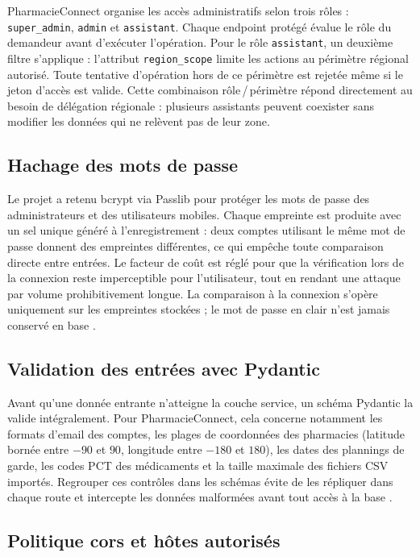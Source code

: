 PharmacieConnect organise les accès administratifs selon trois rôles : \texttt{super\_admin},
\texttt{admin} et \texttt{assistant}. Chaque endpoint protégé évalue le rôle du demandeur avant d'exécuter
l'opération. Pour le rôle \texttt{assistant}, un deuxième filtre s'applique : l'attribut
\texttt{region\_scope} limite les actions au périmètre régional autorisé. Toute tentative d'opération hors
de ce périmètre est rejetée même si le jeton d'accès est valide. Cette combinaison rôle\,/\,périmètre répond
directement au besoin de délégation régionale : plusieurs assistants peuvent coexister sans modifier les
données qui ne relèvent pas de leur zone.

\subsection{Hachage des mots de passe}

Le projet a retenu bcrypt via Passlib pour protéger les mots de passe des administrateurs et des
utilisateurs mobiles. Chaque empreinte est produite avec un sel unique généré à l'enregistrement :
deux comptes utilisant le même mot de passe donnent des empreintes différentes, ce qui empêche
toute comparaison directe entre entrées. Le facteur de coût est réglé pour que la vérification
lors de la connexion reste imperceptible pour l'utilisateur, tout en rendant une attaque par
volume prohibitivement longue. La comparaison à la connexion s'opère uniquement sur les empreintes
stockées ; le mot de passe en clair n'est jamais conservé en base \cite{passlib_bcrypt}.

\subsection{Validation des entrées avec Pydantic}

Avant qu'une donnée entrante n'atteigne la couche service, un schéma Pydantic la valide
intégralement. Pour PharmacieConnect, cela concerne notamment les formats d'email des comptes,
les plages de coordonnées des pharmacies (latitude bornée entre $-90$ et $90$, longitude entre
$-180$ et $180$), les dates des plannings de garde, les codes PCT des médicaments et la taille
maximale des fichiers CSV importés. Regrouper ces contrôles dans les schémas évite de les
répliquer dans chaque route et intercepte les données malformées avant tout accès à la base \cite{pydantic}.

\subsection{Politique \gls{cors} et hôtes autorisés}

